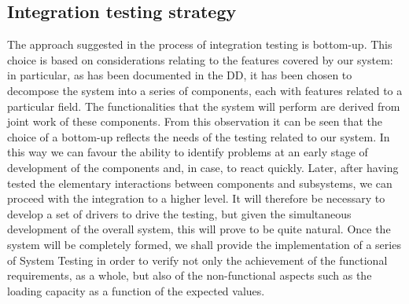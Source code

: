 \documentclass[10pt, a4paper,titlepage]{article}
\begin{document}
\subsection{Integration testing strategy}
The approach suggested in the process of integration testing is bottom-up.
This choice is based on considerations relating to the features covered by our system: in particular, as has been documented in the DD, it has been chosen to decompose the system into a series of components, each with features related to a particular field. The functionalities that the system will perform are derived from joint work of these components. From this observation it can be seen that the choice of a bottom-up reflects the needs of the testing related to our system.
In this way we can favour the ability to identify problems at an early stage of development of the components and, in case, to react quickly. 
Later, after having tested the elementary interactions between components and subsystems, we can proceed with the integration to a higher level.
It will therefore be necessary to develop a set of drivers to drive the testing, but given the simultaneous development of the overall system, this will prove to be quite natural.
Once the system will be completely formed, we shall provide the implementation of a series of System Testing in order to verify not only the achievement of the functional requirements, as a whole, but also of the non-functional aspects such as the loading capacity as a function of the expected values.
\end{document}
